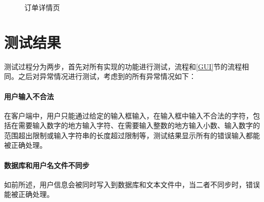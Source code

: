 \documentclass[lang=cn,11pt,a4paper,cite=authornum]{paper}
\begin{document}
\begin{figure}[htbp]
    \caption{订单详情页}

\end{figure}

\section{测试结果}

测试过程分为两步，首先对所有实现的功能进行测试，流程和\ref{GUI}节的流程相同。之后对异常情况进行测试，考虑到的所有异常情况如下：

\paragraph{用户输入不合法} 在客户端中，用户只能通过给定的输入框输入，在输入框中输入不合法的字符，包括在需要输入数字的地方输入字符、在需要输入整数的地方输入小数、输入数字的范围超出限制或输入字符串的长度超过限制等，测试结果显示所有的错误输入都能被正确处理。

\paragraph{数据库和用户名文件不同步} 如前所述，用户信息会被同时写入到数据库和文本文件中，当二者不同步时，错误能被正确处理。
\end{document}
